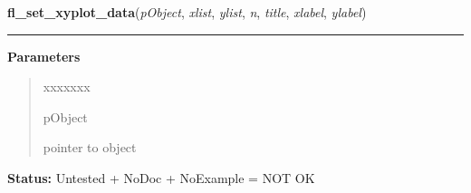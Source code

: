     \label{xformslib:library:fl_set_xyplot_data}

    \vspace{0.5ex}

\hspace{.8\funcindent}\begin{boxedminipage}{\funcwidth}

    \raggedright \textbf{fl\_set\_xyplot\_data}(\textit{pObject}, \textit{xlist}, \textit{ylist}, \textit{n}, \textit{title}, \textit{xlabel}, \textit{ylabel})

    \vspace{-1.5ex}

    \rule{\textwidth}{0.5\fboxrule}
\setlength{\parskip}{2ex}
\setlength{\parskip}{1ex}
      \textbf{Parameters}
      \vspace{-1ex}

      \begin{quote}
        \begin{Ventry}{xxxxxxx}

          \item[pObject]

          pointer to object

        \end{Ventry}

      \end{quote}

\textbf{Status:} Untested + NoDoc + NoExample = NOT OK



    \end{boxedminipage}

    \label{xformslib:library:fl_set_xyplot_data_double}

    \vspace{0.5ex}

